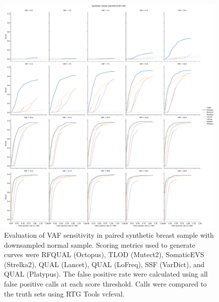 \documentclass{article}
\begin{document}
\begin{figure}[ht!]
    \centering
    \includegraphics[width=\textwidth]{figures/paired_somatic_breast_n20_t65_vaf_recall.pdf}
    \caption{Evaluation of VAF sensitivity in paired synthetic breast sample with downsampled normal sample. Scoring metrics used to generate curves were RFQUAL (Octopus), TLOD (Mutect2), SomaticEVS (Strelka2), QUAL (Lancet), QUAL (LoFreq), SSF (VarDict), and QUAL (Platypus). The false positive rate were calculated using all false positive calls at each score threshold. Calls were compared to the truth sets using RTG Tools vcfeval.}
    \label{supfig:paired-somatic-breast-n20-t65-vaf}
\end{figure}

\clearpage
\end{document}

